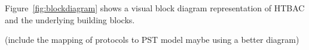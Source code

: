 Figure~\ref{fig:blockdiagram} shows a visual block diagram representation
 of HTBAC and the underlying building
blocks.

(include the mapping of protocols to PST model maybe using a better
diagram)









